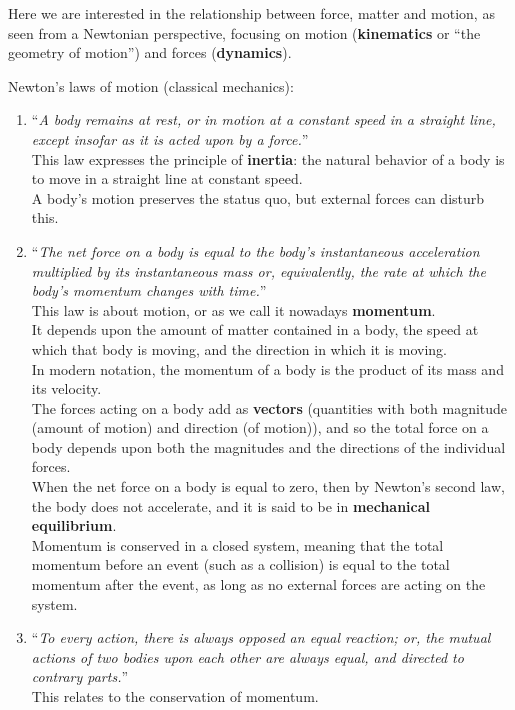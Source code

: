 Here we are interested in the relationship between force, matter and motion, as seen from a Newtonian perspective, focusing on motion (\textbf{kinematics} or ``the geometry of motion'') and forces (\textbf{dynamics}).

Newton's laws of motion (classical mechanics):

\begin{enumerate}
    \item ``\textit{A body remains at rest, or in motion at a constant speed in a straight line, except insofar as it is acted upon by a force.}'' \\
    This law expresses the principle of \textbf{\gls{inertia}}: the natural behavior of a body is to move in a straight line at constant speed. \\
    A body's motion preserves the status quo, but external forces can disturb this.
    \item ``\textit{The net force on a body is equal to the body's instantaneous acceleration multiplied by its instantaneous mass or, equivalently, the rate at which the body's momentum changes with time.}'' \\
    This law is about motion, or as we call it nowadays \textbf{\gls{momentum}}. \\
    It depends upon the amount of matter contained in a body, the speed at which that body is moving, and the direction in which it is moving. \\
    In modern notation, the momentum of a body is the product of its mass and its velocity. \\
    The forces acting on a body add as \textbf{\gls{vector}s} (quantities with both magnitude (amount of motion) and direction (of motion)), and so the total force on a body depends upon both the magnitudes and the directions of the individual forces. \\
    When the net force on a body is equal to zero, then by Newton's second law, the body does not accelerate, and it is said to be in \textbf{mechanical equilibrium}. \\
    Momentum is conserved in a closed system, meaning that the total momentum before an event (such as a collision) is equal to the total momentum after the event, as long as no external forces are acting on the system.
    \item ``\textit{To every action, there is always opposed an equal reaction; or, the mutual actions of two bodies upon each other are always equal, and directed to contrary parts.}'' \\
    This relates to the conservation of momentum.
\end{enumerate}

